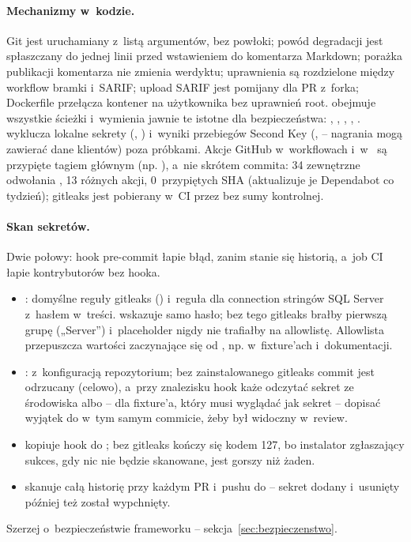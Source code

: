 \paragraph{Mechanizmy w~kodzie.} Git jest uruchamiany z~listą argumentów, bez powłoki;
powód degradacji jest spłaszczany do jednej linii przed wstawieniem do komentarza Markdown;
porażka publikacji komentarza nie zmienia werdyktu; uprawnienia są rozdzielone między
workflow bramki i~SARIF; upload SARIF jest pomijany dla PR z~forka; Dockerfile przełącza
kontener na użytkownika bez uprawnień root.  obejmuje wszystkie ścieżki i~wymienia
jawnie te istotne dla bezpieczeństwa: , ,
, , .
 wyklucza lokalne sekrety (, )
i~wyniki przebiegów Second Key (,  -- nagrania mogą
zawierać dane klientów) poza próbkami. Akcje GitHub w~workflowach i~w~
są przypięte tagiem głównym (np. ), a~nie skrótem commita: 34
zewnętrzne odwołania , 13 różnych akcji, 0~przypiętych SHA (aktualizuje je
Dependabot co tydzień); gitleaks jest pobierany w~CI przez  bez sumy
kontrolnej.

\paragraph{Skan sekretów.} Dwie połowy: hook pre-commit łapie błąd, zanim stanie się
historią, a~job CI łapie kontrybutorów bez hooka.
\begin{itemize}[leftmargin=*]
  \item {}: domyślne reguły gitleaks ()
        i~reguła  dla connection stringów
        SQL Server z~hasłem w~treści.  wskazuje samo hasło; bez tego
        gitleaks brałby pierwszą grupę („Server”) i~placeholder nigdy nie trafiałby na
        allowlistę. Allowlista przepuszcza wartości zaczynające się od \repopath{<}, np.
         w~fixture'ach i~dokumentacji.
  \item {}: 
        z~konfiguracją repozytorium; bez zainstalowanego gitleaks commit jest odrzucany
        (celowo), a~przy znalezisku hook każe odczytać sekret ze środowiska albo -- dla
        fixture'a, który musi wyglądać jak sekret -- dopisać wyjątek do
         w~tym samym commicie, żeby był widoczny w~review.
  \item {} kopiuje hook do ; bez gitleaks kończy
        się kodem 127, bo instalator zgłaszający sukces, gdy nic nie będzie skanowane, jest
        gorszy niż żaden.
  \item {} skanuje całą historię przy każdym PR i~pushu do
         -- sekret dodany i~usunięty później też został wypchnięty.
\end{itemize}
Szerzej o~bezpieczeństwie frameworku -- sekcja~\ref{sec:bezpieczenstwo}.

